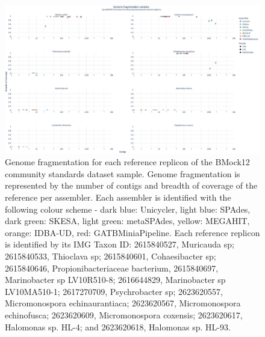 \begin{figure}[]
\centering
\includegraphics[width=\textwidth]{figures/chapter 5/Supplemental Figure 8.png}
\caption{Genome fragmentation for each reference replicon of the BMock12 community standards dataset sample. Genome fragmentation is represented by the number of contigs and breadth of coverage of the reference per assembler. Each assembler is identified with the following colour scheme - dark blue: Unicycler, light blue: SPAdes, dark green: SKESA, light green: metaSPAdes, yellow: MEGAHIT, orange: IDBA-UD, red: GATBMiniaPipeline. Each reference replicon is identified by its IMG Taxon ID: 2615840527, Muricauda sp; 2615840533, Thioclava sp; 2615840601, Cohaesibacter sp; 2615840646, Propionibacteriaceae bacterium, 2615840697, Marinobacter sp LV10R510-8; 2616644829, Marinobacter sp LV10MA510-1; 2617270709, Psychrobacter sp; 2623620557, Micromonospora echinaurantiaca; 2623620567, Micromonospora echinofusca; 2623620609, Micromonospora coxensis; 2623620617, Halomonas sp. HL-4; and 2623620618, Halomonas sp. HL-93. }
\label{fig:chap5_sup_figure_8}
\end{figure}

